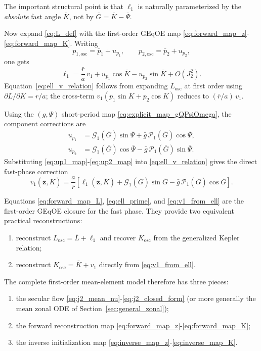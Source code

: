 \documentclass[11pt]{article}
\begin{document}
The important structural point is that $\ell_1$ is naturally parameterized by
the \emph{absolute} fast angle $\bar K$, not by
$\bar G = \bar K - \bar\Psi$.

Now expand \eqref{eq:L_def} with the first-order GEqOE map
\eqref{eq:forward_map_z}-\eqref{eq:forward_map_K}. Writing
\begin{equation}
p_{1,\mathrm{osc}} = \bar p_1 + u_{p_1},
\qquad
p_{2,\mathrm{osc}} = \bar p_2 + u_{p_2},
\end{equation}
one gets
\begin{equation}
\ell_1
= \frac{\bar r}{a}\,v_1
+ u_{p_1}\cos\bar K
- u_{p_2}\sin\bar K
+ O(J_2^2).
\label{eq:ell_v_relation}
\end{equation}
Equation~\eqref{eq:ell_v_relation} follows from expanding $L_{\mathrm{osc}}$
at first order using $\partial L/\partial K = r/a$; the cross-term
$v_1(p_1\sin K + p_2\cos K)$ reduces to $(\bar r/a)\,v_1$.

Using the $(g,\Psi)$ short-period map
\eqref{eq:explicit_map_gQPsiOmega}, the component corrections are
\begin{align}
u_{p_1}
&= \mathcal G_1(\bar G)\sin\bar\Psi
+ \bar g\,\mathcal P_1(\bar G)\cos\bar\Psi,
\label{eq:up1_map}\\
u_{p_2}
&= \mathcal G_1(\bar G)\cos\bar\Psi
- \bar g\,\mathcal P_1(\bar G)\sin\bar\Psi.
\label{eq:up2_map}
\end{align}
Substituting \eqref{eq:up1_map}-\eqref{eq:up2_map} into
\eqref{eq:ell_v_relation} gives the direct fast-phase correction
\begin{equation}
v_1(\bar{\bm z},\bar K)
= \frac{a}{\bar r}
\left[
\ell_1(\bar{\bm z},\bar K)
+ \mathcal G_1(\bar G)\sin\bar G
- \bar g\,\mathcal P_1(\bar G)\cos\bar G
\right].
\label{eq:v1_from_ell}
\end{equation}

Equations \eqref{eq:forward_map_L}, \eqref{eq:ell_prime}, and
\eqref{eq:v1_from_ell} are the first-order GEqOE closure for the fast
phase. They provide two equivalent practical reconstructions:
\begin{enumerate}
    \item reconstruct $L_{\mathrm{osc}} = \bar L + \ell_1$ and recover
    $K_{\mathrm{osc}}$ from the generalized Kepler relation;
    \item reconstruct $K_{\mathrm{osc}} = \bar K + v_1$ directly from
    \eqref{eq:v1_from_ell}.
\end{enumerate}

The complete first-order mean-element model therefore has three pieces:
\begin{enumerate}
    \item the secular flow
    \eqref{eq:j2_mean_nu}-\eqref{eq:j2_closed_form} (or more generally the
    mean zonal ODE of Section~\ref{sec:general_zonal});
    \item the forward reconstruction map
    \eqref{eq:forward_map_z}-\eqref{eq:forward_map_K};
    \item the inverse initialization map
    \eqref{eq:inverse_map_z}-\eqref{eq:inverse_map_K}.
\end{enumerate}
\end{document}
